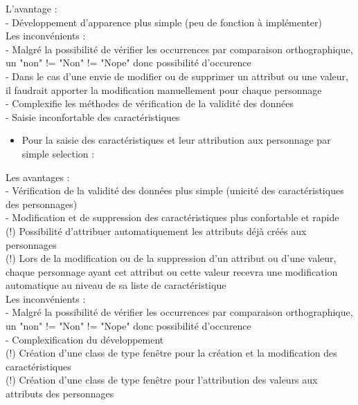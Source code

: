\documentclass[a4paper]{article}
\begin{document}
L'avantage :\\  
  - Développement d'apparence plus simple (peu de fonction à implémenter)\\

Les inconvénients :\\
  - Malgré la possibilité de vérifier les occurrences par comparaison orthographique, un "non" != "Non" != "Nope" donc possibilité d'occurence\\
  - Dans le cas d'une envie de modifier ou de supprimer un attribut ou une valeur, il faudrait apporter la modification manuellement pour chaque personnage\\
  - Complexifie les méthodes de vérification de la validité des données\\
  - Saisie inconfortable des caractéristiques
\begin{itemize}
\item {Pour la saisie des caractéristiques et leur attribution aux personnage par simple selection :}
\end{itemize}

Les avantages :\\
- Vérification de la validité des données plus simple (unicité des caractéristiques des personnages)\\
- Modification et de suppression des caractéristiques plus confortable et rapide\\

(!) Possibilité d'attribuer automatiquement les attributs déjà créés aux personnages\\

(!) Lors de la modification ou de la suppression d'un attribut ou d'une valeur, chaque personnage ayant cet attribut ou cette valeur recevra une modification automatique au niveau de sa liste de caractéristique\\
            
Les inconvénients :\\
- Malgré la possibilité de vérifier les occurrences par comparaison orthographique, un "non" != "Non" != "Nope" donc possibilité d'occurence\\
- Complexification du développement\\

(!) Création d'une class de type fenêtre pour la création et la modification des caractéristiques\\

(!) Création d'une class de type fenêtre pour l'attribution des valeurs aux attributs des personnages\\              
\end{document}
